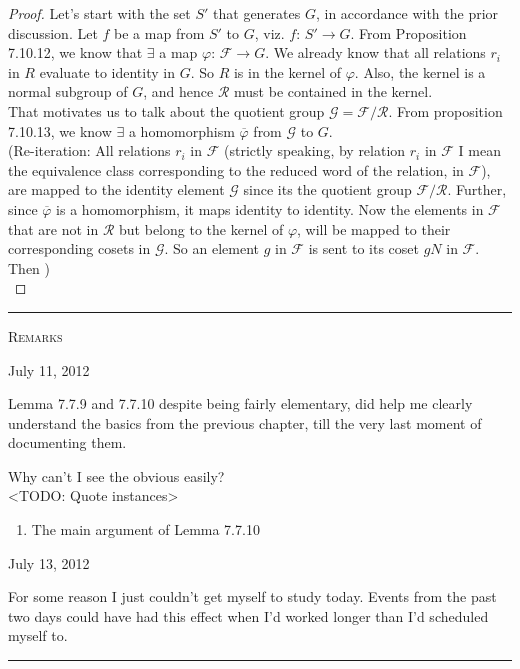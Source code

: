 \documentclass[12pt]{article}
\begin{document}
\begin{proof}
Let's start with the set $S'$ that generates $G$, in accordance with the prior discussion. Let $f$ be a map from $S'$ to $G$, viz. $f:\,S' \rightarrow G$. From Proposition 7.10.12, we know that $\exists$ a map $\varphi : \, \mathcal F \rightarrow G$. We already know that all relations $r_{i}$ in $R$ evaluate to identity in $G$. So $R$ is in the kernel of $\varphi$. Also, the kernel is a normal subgroup of $G$, and hence $\mathcal R$ must be contained in the kernel.\\
That motivates us to talk about the quotient group $\mathcal {G = F/R}$. From proposition 7.10.13, we know $\exists$ a homomorphism $\overline \varphi$ from $\mathcal G$ to $G$.\\
(Re-iteration: All relations $r_{i}$ in $\mathcal F$ (strictly speaking, by relation $r_{i}$ in $\mathcal F$ I mean the equivalence class corresponding to the reduced word of the relation, in $\mathcal F$), are mapped to the identity element $\mathcal G$ since its the quotient group $\mathcal {F/R}$. Further, since $\overline \varphi$ is a homomorphism, it maps identity to identity. Now the elements in $\mathcal F$ that are not in $\mathcal R$ but belong to the kernel of $\varphi$, will be mapped to their corresponding cosets in $\mathcal G$. So an element $g$ in $\mathcal F$ is sent to its coset $gN$ in $\mathcal F$. Then )\\

\end{proof}

\vspace{500pt}
\hrule
\vspace{12pt}
\begin{center}
{\textsc {Remarks}}
\end{center}

\begin{flushright} {\small July 11, 2012} \end{flushright}
Lemma 7.7.9 and 7.7.10 despite being fairly elementary, did help me clearly understand the basics from the previous chapter, till the very last moment of documenting them.
\par
Why can't I see the obvious easily?\\
<TODO: Quote instances>
\begin{enumerate}
\item The main argument of Lemma 7.7.10
\end{enumerate}
\begin{flushright} {\small July 13, 2012} \end{flushright}
For some reason I just couldn't get myself to study today. Events from the past two days could have had this effect when I'd worked longer than I'd scheduled myself to.
\vspace{12pt}
\hrule
\end{document}
